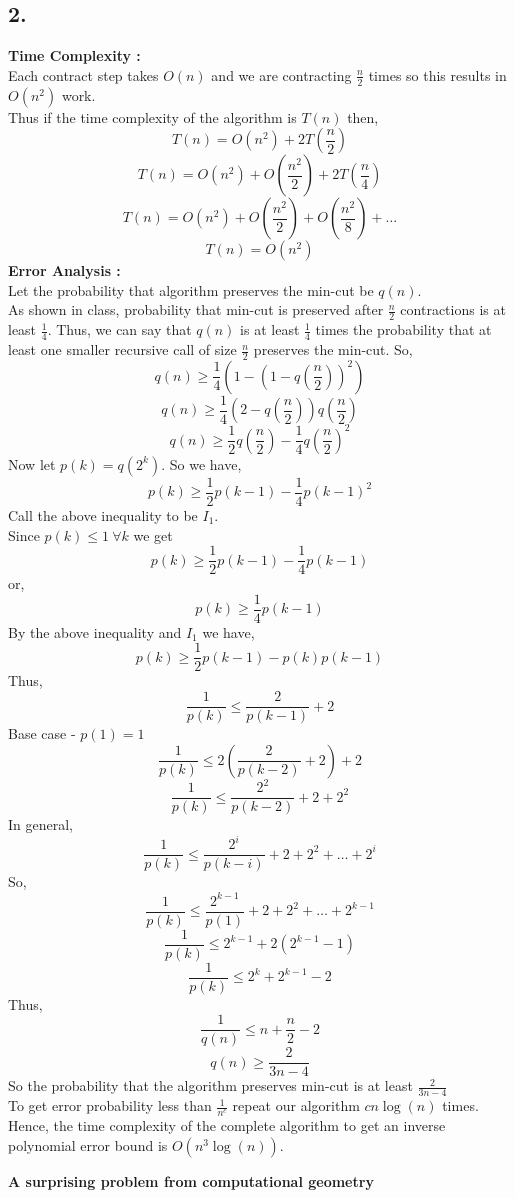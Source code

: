 \documentclass[a4paper]{article}
\begin{document}
\subsection*{2.}
\textbf{Time Complexity :}\\
Each contract step takes $O(n)$ and we are contracting $\frac{n}{2}$ times so this results in $O(n^2)$ work.\\
Thus if the time complexity of the algorithm is $T(n)$ then,
$$T(n) = O(n^2) + 2T(\frac{n}{2})$$
$$T(n) = O(n^2) + O(\frac{n^2}{2}) + 2T(\frac{n}{4})$$
$$T(n) = O(n^2) + O(\frac{n^2}{2}) + O(\frac{n^2}{8}) + \dots$$
$$T(n) = O(n^2)$$
\textbf{Error Analysis :}\\
Let the probability that algorithm preserves the min-cut be $q(n)$.\\
As shown in class, probability that min-cut is preserved after $\frac{n}{2}$ contractions is at least $\frac{1}{4}$.
Thus, we can say that $q(n)$ is at least $\frac{1}{4}$ times the probability that at least one smaller recursive call of size $\frac{n}{2}$ preserves the min-cut.
So,
$$q(n) \geq \frac{1}{4}\left(1-\left(1-q\left(\frac{n}{2}\right)\right)^2\right)$$
$$q(n) \geq \frac{1}{4}\left(2 - q\left(\frac{n}{2}\right)\right)q\left(\frac{n}{2}\right)$$
$$q(n) \geq \frac{1}{2}q\left(\frac{n}{2}\right) - \frac{1}{4}q\left(\frac{n}{2}\right)^2$$
Now let $p(k) = q(2^k)$. So we have,
$$p(k) \geq \frac{1}{2}p\left(k-1\right) - \frac{1}{4}p\left(k-1\right)^2$$
Call the above inequality to be $I_1$.\\
Since $p(k) \leq 1\ \forall k$ we get $$p(k) \geq \frac{1}{2}p\left(k-1\right) - \frac{1}{4}p\left(k-1\right)$$
or,
$$p(k) \geq \frac{1}{4}p\left(k-1\right)$$
By the above inequality and $I_1$ we have,
$$p(k) \geq \frac{1}{2}p\left(k-1\right) - p(k)p\left(k-1\right)$$
Thus,
$$\frac{1}{p(k)} \leq \frac{2}{p(k-1)} + 2$$
Base case - $p(1) = 1$
$$\frac{1}{p(k)} \leq 2\left(\frac{2}{p(k-2)} + 2\right) + 2$$
$$\frac{1}{p(k)} \leq \frac{2^2}{p(k-2)} + 2 + 2^2$$
In general,
$$\frac{1}{p(k)} \leq \frac{2^i}{p(k-i)} + 2 + 2^2 + \dots + 2^i$$
So,
$$\frac{1}{p(k)} \leq \frac{2^{k-1}}{p(1)} + 2 + 2^2 + \dots + 2^{k-1}$$
$$\frac{1}{p(k)} \leq 2^{k-1} + 2(2^{k-1}-1)$$
$$\frac{1}{p(k)} \leq 2^k + 2^{k-1} - 2$$
Thus,
$$\frac{1}{q(n)} \leq n + \frac{n}{2} - 2$$
$$q(n) \geq \frac{2}{3n - 4}$$
So the probability that the algorithm preserves min-cut is at least $\frac{2}{3n - 4}$\\
To get error probability less than $\frac{1}{n^c}$ repeat our algorithm $cn\log(n)$ times.\\
Hence, the time complexity of the complete algorithm to get an inverse polynomial error bound is $O(n^3 \log(n))$.
\pagebreak
\begin{question}[]
\textbf{A surprising problem from computational geometry}
\end{question}
\end{document}
